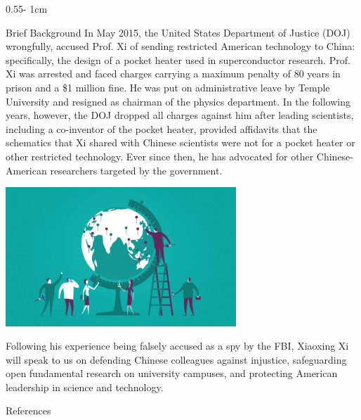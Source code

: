 \documentclass{../psuposter}
\begin{document}
\begin{frame}
\begin{columns}[t, totalwidth=\textwidth]
\begin{column}{0.55\textwidth - 1cm}
    \begin{block}{Brief Background}
    In May 2015, the United States Department of Justice (DOJ) wrongfully, accused Prof. Xi of sending restricted American technology to China: specifically, the design of a pocket heater used in superconductor research. Prof. Xi was arrested and faced charges carrying a maximum penalty of 80 years in prison and a \$1 million fine. He was put on administrative leave by Temple University and resigned as chairman of the physics department. In the following years, however, the DOJ dropped all charges against him after leading scientists, including a co-inventor of the pocket heater, provided affidavits that the schematics that Xi shared with Chinese scientists were not for a pocket heater or other restricted technology. Ever since then, he has advocated for other Chinese-American researchers targeted by the government.
    	
        \begin{center}
		   	\includegraphics[width=0.65\textwidth]{images/background.jpg}    		
    	\end{center}
		Following his experience being falsely accused as a spy by the FBI, Xiaoxing Xi will speak to us on defending Chinese colleagues against injustice, safeguarding open fundamental research on university campuses, and protecting American leadership in science and technology.  
    \end{block}


    \begin{block}{References}
    \nocite{*}
        
%        
		
    \end{block}


\end{column}
\end{columns}
\end{frame}
\end{document}
